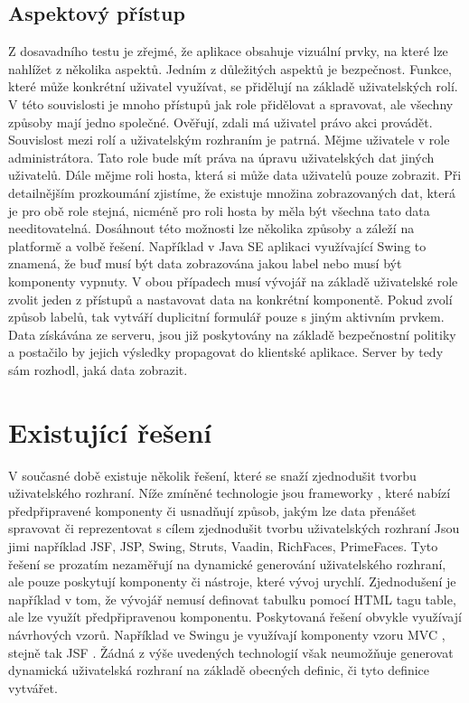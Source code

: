 \subsection{Aspektový přístup}
Z dosavadního testu je zřejmé, že aplikace obsahuje vizuální prvky, na které lze nahlížet z několika aspektů. Jedním z důležitých aspektů je bezpečnost. Funkce, které může konkrétní uživatel využívat, se přidělují na základě uživatelských rolí. V této souvislosti je mnoho přístupů jak role přidělovat a spravovat, ale všechny způsoby mají jedno společné. Ověřují, zdali má uživatel právo akci provádět. Souvislost mezi rolí a uživatelským rozhraním je patrná. Mějme uživatele v role administrátora. Tato role bude mít práva na úpravu uživatelských dat jiných uživatelů. Dále mějme roli hosta, která si může data uživatelů pouze zobrazit. Při detailnějším prozkoumání zjistíme, že existuje množina zobrazovaných dat, která je pro obě role stejná, nicméně pro roli hosta by měla být všechna tato data needitovatelná. Dosáhnout této možnosti lze několika způsoby a záleží na platformě a volbě řešení. Například v Java SE aplikaci využívající Swing to znamená, že buď musí být data zobrazována jakou label nebo musí být komponenty vypnuty. V obou případech musí vývojář na základě uživatelské role zvolit jeden z přístupů a nastavovat data na konkrétní komponentě. Pokud zvolí způsob labelů, tak vytváří duplicitní formulář pouze s jiným aktivním prvkem. Data získávána ze serveru, jsou již poskytovány na základě bezpečnostní politiky a postačilo by jejich výsledky propagovat do klientské aplikace. Server by tedy sám rozhodl, jaká data zobrazit.
\section{Existující řešení}
V současné době existuje několik řešení, které se snaží zjednodušit tvorbu uživatelského rozhraní. Níže zmíněné technologie jsou frameworky \cite{framework}, které nabízí předpřipravené komponenty či usnadňují způsob, jakým lze data přenášet spravovat či reprezentovat s cílem zjednodušit tvorbu uživatelských rozhraní Jsou jimi například JSF, JSP, Swing, Struts, Vaadin, RichFaces, PrimeFaces. Tyto řešení se prozatím nezaměřují na dynamické generování uživatelského rozhraní, ale pouze poskytují komponenty či nástroje, které vývoj urychlí. Zjednodušení je například v tom, že vývojář nemusí definovat tabulku pomocí HTML tagu table, ale lze využít předpřipravenou komponentu. Poskytovaná řešení obvykle využívají návrhových vzorů. Například ve Swingu je využívají komponenty vzoru MVC \cite{fowler}, stejně tak JSF \cite{javaEETutorial}. Žádná z výše uvedených technologií však neumožňuje generovat dynamická uživatelská rozhraní na základě obecných definic, či tyto definice vytvářet.
